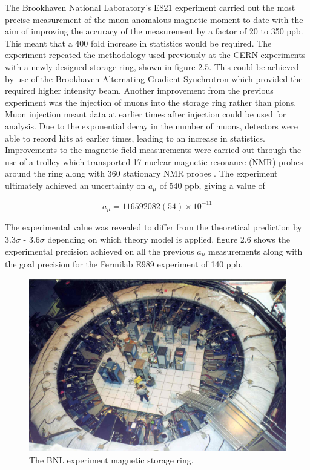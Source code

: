 The Brookhaven National Laboratory's E821 experiment carried out the most precise measurement of the muon anomalous magnetic moment to date with the aim of improving the accuracy of the measurement by a factor of 20 to 350 ppb. This meant that a 400 fold increase in statistics would be required. The experiment repeated the methodology used previously at the CERN experiments with a newly designed storage ring, shown in figure 2.5. This could be achieved by use of the Brookhaven Alternating Gradient Synchrotron \cite{Reference10} which provided the required higher intensity beam. Another improvement from the previous experiment was the injection of muons into the storage ring rather than pions. Muon injection meant data at earlier times after injection could be used for analysis. Due to the exponential decay in the number of muons, detectors were able to record hits at earlier times, leading to an increase in statistics. Improvements to the magnetic field measurements were carried out through the use of a trolley which transported 17 nuclear magnetic resonance (NMR) probes around the ring along with 360 stationary NMR probes \cite{Reference10}. 
The experiment ultimately achieved an uncertainty on $a_{\mu}$ of 540 ppb, giving a value of \cite{Reference13}\cite{Reference14}

\begin{equation}
a_{\mu} = 116 592 082(54){\times}10^{-11}
\end{equation}

The experimental value was revealed to differ from the theoretical prediction by 3.3$\sigma$ - 3.6$\sigma$ depending on which theory model is applied. figure 2.6 shows the experimental precision achieved on all the previous $a_{\mu}$ measurements along with the goal precision for the Fermilab E989 experiment of 140 ppb. 

\begin{figure}[th]
\centering
\includegraphics[scale=0.7]{Figures/bnl}
\decoRule
\caption{The BNL experiment magnetic storage ring.}
\label{fig:bnl}
\end{figure}


